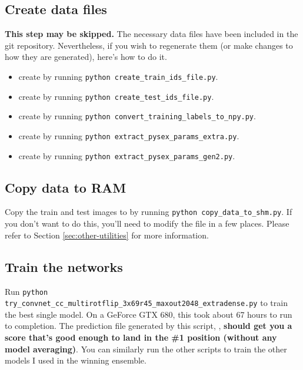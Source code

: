 \documentclass[a4paper,10pt]{article}
\begin{document}
\subsection{Create data files}

\textbf{This step may be skipped.} The necessary data files have been included in the git repository. Nevertheless, if you wish to regenerate them (or make changes to how they are generated), here's how to do it.

\begin{itemize}
 \item create  by running \texttt{python create\_train\_ids\_file.py}.
 \item create  by running \texttt{python create\_test\_ids\_file.py}.
 \item create  by running \texttt{python convert\_training\_labels\_to\_npy.py}.
 \item create  by running \texttt{python extract\_pysex\_params\_extra.py}.
 \item create  by running \texttt{python extract\_pysex\_params\_gen2.py}.
\end{itemize}

\subsection{Copy data to RAM}

Copy the train and test images to  by running \texttt{python copy\_data\_to\_shm.py}. If you don't want to do this, you'll need to modify the  file in a few places. Please refer to Section \ref{sec:other-utilities} for more information.

\subsection{Train the networks}

Run \texttt{python try\_convnet\_cc\_multirotflip\_3x69r45\_maxout2048\_extradense.py} to train the best single model. On a GeForce GTX 680, this took about 67 hours to run to completion. The prediction file generated by this script, , \textbf{should get you a score that's good enough to land in the \#1 position (without any model averaging)}. You can similarly run the other  scripts to train the other models I used in the winning ensemble.
\end{document}
